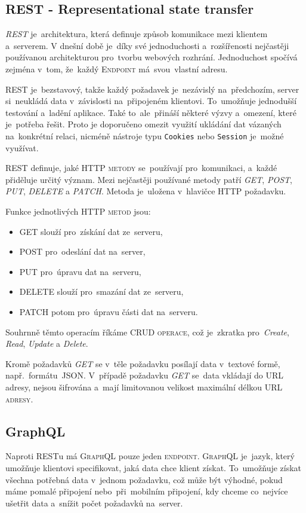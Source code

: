 \documentclass[14pt,a4paper]{article}
\begin{document}
        \subsection{REST - Representational state transfer}
        \emph{REST} je~architektura, která definuje způsob komunikace mezi klientem a~serverem. V dnešní době je~díky své jednoduchosti a~rozšířenosti nejčastěji používanou architekturou pro~tvorbu webových rozhrání. Jednoduchost spočívá zejména v~tom, že~každý \textsc{Endpoint} má~svou~vlastní adresu.
        
        \textsc{REST} je~bezstavový, takže každý požadavek je~nezávislý na~předchozím, server si~neukládá data v~závislosti na~připojeném klientovi. To~umožňuje jednodušší testování a~ladění aplikace. Také to~ale~přináší některé výzvy a~omezení, které je~potřeba řešit. Proto je doporučeno omezit využití ukládání dat vázaných na~konkrétní relaci, nicméně nástroje typu \texttt{Cookies} nebo \texttt{Session} je~možné využívat.
        
        \textsc{REST} definuje, jaké \textsc{HTTP metody} se~používají pro~komunikaci, a~každé přiděluje určitý význam. Mezi nejčastěji používané metody patří \emph{GET}, \emph{POST}, \emph{PUT}, \emph{DELETE} a \emph{PATCH}. Metoda je~uložena v~hlavičce HTTP požadavku.

        Funkce jednotlivých \textsc{HTTP metod} jsou:
        \begin{itemize}
            \item \textsc{GET} slouží pro~získání dat ze~serveru,
            \item \textsc{POST} pro~odeslání dat na~server,
            \item \textsc{PUT} pro~úpravu dat na~serveru,
            \item \textsc{DELETE} slouží pro~smazání dat ze~serveru,
            \item \textsc{PATCH} potom pro~úpravu části dat na~serveru.
        \end{itemize}

        Souhrnně těmto operacím říkáme \textsc{CRUD operace}, což je~zkratka pro~\emph{Create}, \emph{Read}, \emph{Update} a \emph{Delete}.

        Kromě požadavků \emph{GET} se v~těle požadavku posílají data v~textové formě, např.~formátu~JSON. 
        V~případě požadavku \emph{GET} se~data vkládají do URL adresy, nejsou šifrována a~mají limitovanou velikost maximální délkou \textsc{URL adresy}.

        \subsection{GraphQL}
        Naproti \textsc{REST}u má \textsc{GraphQL} pouze jeden \textsc{endpoint}. \textsc{GraphQL} je~jazyk, který umožňuje klientovi specifikovat, jaká data chce klient získat. To~umožňuje získat všechna potřebná data v~jednom požadavku, což může být výhodné, pokud máme pomalé připojení nebo~při~mobilním připojení, kdy chceme co~nejvíce ušetřit data a~snížit počet požadavků na~server.
\end{document}
